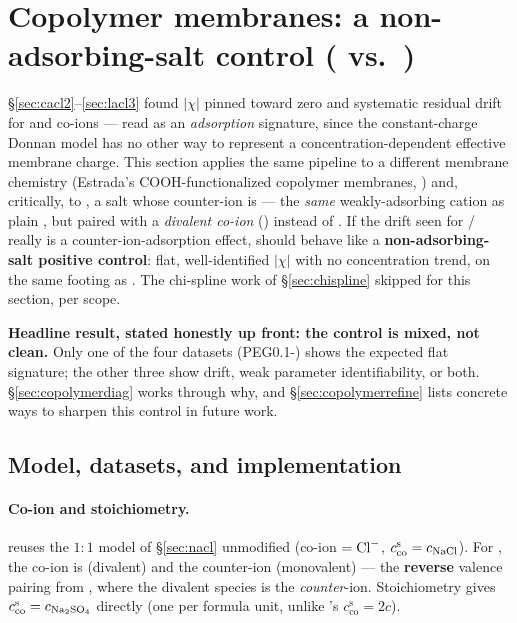 \documentclass[11pt]{article}
\newcommand{\cs}[1]{{c^{\mathrm{s}}_{#1}}}
\newcommand{\co}{\mathrm{co}}
\begin{document}
\section{Copolymer membranes: a non-adsorbing-salt control ( vs.\ )}\label{sec:copolymer}
\S\ref{sec:cacl2}--\ref{sec:lacl3} found $|\chi|$ pinned toward zero and
systematic residual drift for  and  co-ions --- read
as an \emph{adsorption} signature, since the constant-charge Donnan model has
no other way to represent a concentration-dependent effective membrane
charge. This section applies the same pipeline to a different membrane
chemistry (Estrada's COOH-functionalized copolymer membranes,
\cite{estrada2026spacerarm}) and, critically, to \textbf{}, a salt
whose counter-ion is  --- the \emph{same} weakly-adsorbing cation as
plain , but paired with a \emph{divalent co-ion} ()
instead of . If the drift seen for / really is a
counter-ion-adsorption effect,  should behave like a
\textbf{non-adsorbing-salt positive control}: flat, well-identified $|\chi|$
with no concentration trend, on the same footing as . The chi-spline
work of \S\ref{sec:chispline} skipped for this section, per scope.

\textbf{Headline result, stated honestly up front: the control is mixed, not
clean.} Only one of the four datasets (PEG0.1-) shows the expected
flat signature; the other three show drift, weak parameter identifiability,
or both. \S\ref{sec:copolymerdiag} works through why, and
\S\ref{sec:copolymerrefine} lists concrete ways to sharpen this control in
future work.

\subsection{Model, datasets, and implementation}\label{sec:copolymerimpl}
\paragraph{Co-ion and stoichiometry.}  reuses the $1{:}1$ model of
\S\ref{sec:nacl} unmodified (co-ion $=\ce{Cl-}$, $\cs{\co}=c_{\ce{NaCl}}$).
For , the co-ion is  (divalent) and the counter-ion
 (monovalent) --- the \textbf{reverse} valence pairing from
, where the divalent species is the \emph{counter}-ion. Stoichiometry
gives $\cs{\co}=c_{\ce{Na2SO4}}$ directly (one  per formula unit,
unlike 's $\cs{\co}=2c$).
\end{document}
